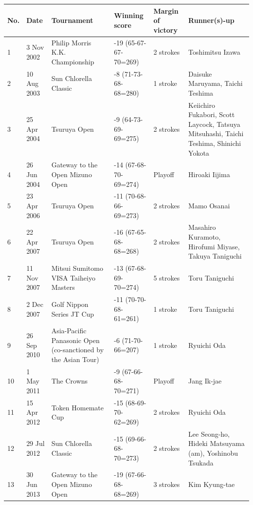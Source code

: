 \documentclass{article}
\begin{document}
\begin{tabular}{llllll}
\toprule
No. & Date & Tournament & Winning score & Margin of victory & Runner(s)-up \\
\midrule
1 & 3 Nov 2002 & Philip Morris K.K. Championship & -19 (65-67-67-70=269) & 2 strokes & Toshimitsu Izawa \\
2 & 10 Aug 2003 & Sun Chlorella Classic & -8 (71-73-68-68=280) & 1 stroke & Daisuke Maruyama,  Taichi Teshima \\
3 & 25 Apr 2004 & Tsuruya Open & -9 (64-73-69-69=275) & 2 strokes & Keiichiro Fukabori,  Scott Laycock,  Tatsuya Mitsuhashi,  Taichi Teshima,  Shinichi Yokota \\
4 & 26 Jun 2004 & Gateway to the Open Mizuno Open & -14 (67-68-70-69=274) & Playoff & Hiroaki Iijima \\
5 & 23 Apr 2006 & Tsuruya Open & -11 (70-68-66-69=273) & 2 strokes & Mamo Osanai \\
6 & 22 Apr 2007 & Tsuruya Open & -16 (67-65-68-68=268) & 2 strokes & Masahiro Kuramoto,  Hirofumi Miyase,  Takuya Taniguchi \\
7 & 11 Nov 2007 & Mitsui Sumitomo VISA Taiheiyo Masters & -13 (67-68-69-70=274) & 5 strokes & Toru Taniguchi \\
8 & 2 Dec 2007 & Golf Nippon Series JT Cup & -11 (70-70-68-61=261) & 1 stroke & Toru Taniguchi \\
9 & 26 Sep 2010 & Asia-Pacific Panasonic Open (co-sanctioned by the Asian Tour) & -6 (71-70-66=207) & 1 stroke & Ryuichi Oda \\
10 & 1 May 2011 & The Crowns & -9 (67-66-68-70=271) & Playoff & Jang Ik-jae \\
11 & 15 Apr 2012 & Token Homemate Cup & -15 (68-69-70-62=269) & 2 strokes & Ryuichi Oda \\
12 & 29 Jul 2012 & Sun Chlorella Classic & -15 (69-66-68-70=273) & 2 strokes & Lee Seong-ho,  Hideki Matsuyama (am),  Yoshinobu Tsukada \\
13 & 30 Jun 2013 & Gateway to the Open Mizuno Open & -19 (67-66-68-68=269) & 3 strokes & Kim Kyung-tae \\
\bottomrule
\end{tabular}
\end{document}
